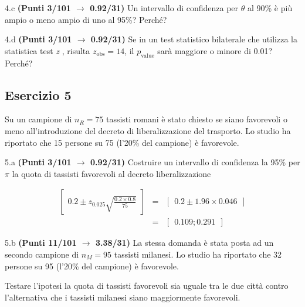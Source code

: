 \documentclass[
  11pt,
]{book}
\theoremstyle{mytheoremstyle}
\theoremstyle{mydefstyle}
\newenvironment{sol}
  {
  \begin{tcolorbox}[enhanced,breakable,arc=0.1mm,boxrule=1pt,colback=white,colframe=iblue,
  title=\bf \fontfamily{lmss}\selectfont \hspace{.5 cm} Soluzione,drop fuzzy shadow]

}{
\end{tcolorbox}
  }
\begin{document}
4.c \textbf{(Punti 3/101 \(\rightarrow\) 0.92/31)} Un intervallo di confidenza per \(\theta\) al 90\% è più ampio o meno ampio di uno al 95\%? Perché?

4.d \textbf{(Punti 3/101 \(\rightarrow\) 0.92/31)} Se in un test statistico bilaterale che utilizza la statistica test \emph{z} , risulta \(z_\text{obs}=14\), il \(p_\text{value}\) sarà maggiore o minore di 0.01? Perché?

\subsection{Esercizio 5}\label{esercizio-5-16}

Su un campione di \(n_R=75\) tassisti romani è stato chiesto se siano favorevoli o meno all'introduzione
del decreto di liberalizzazione del trasporto. Lo studio ha riportato che 15 persone su 75 (l'20\% del campione) è favorevole.

5.a \textbf{(Punti 3/101 \(\rightarrow\) 0.92/31)} Costruire un intervallo di confidenza la 95\% per \(\pi\) la quota di tassisti favorevoli al decreto liberalizzazione

\begin{sol}
\begin{eqnarray*}
  \left[~~0.2\pm z_{0.025}\sqrt{\frac{0.2\times 0.8}{75}}~~\right] &=&
  \left[~~0.2\pm 1.96\times0.046~~\right]\\
  &=&\left[~~0.109; 0.291~~\right]
\end{eqnarray*}

\end{sol}

5.b \textbf{(Punti 11/101 \(\rightarrow\) 3.38/31)} La stessa domanda è stata posta ad un secondo
campione di \(n_M=95\) tassisti milanesi. Lo studio ha riportato che 32 persone su 95 (l'20\% del campione) è favorevole.

Testare l'ipotesi la quota di tassisti favorevoli sia uguale tra le due città contro
l'alternativa che i tassisti milanesi siano maggiormente favorevoli.
\end{document}
